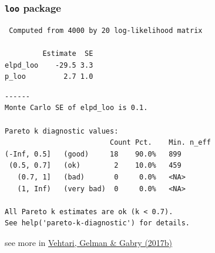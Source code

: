 \documentclass[english,t]{beamer}
\begin{document}
\begin{frame}[fragile]
  \frametitle{{\tt loo} package}

  {\scriptsize
    {\color{gray}
\begin{lstlisting}
 Computed from 4000 by 20 log-likelihood matrix

         Estimate  SE
elpd_loo    -29.5 3.3
p_loo         2.7 1.0
\end{lstlisting}
      }
\begin{lstlisting}
------
Monte Carlo SE of elpd_loo is 0.1.

Pareto k diagnostic values:
                         Count Pct.    Min. n_eff
(-Inf, 0.5]   (good)     18    90.0%   899       
 (0.5, 0.7]   (ok)        2    10.0%   459       
   (0.7, 1]   (bad)       0     0.0%   <NA>      
   (1, Inf)   (very bad)  0     0.0%   <NA>      

All Pareto k estimates are ok (k < 0.7).
See help('pareto-k-diagnostic') for details.
\end{lstlisting}
    }

    {\vspace{2\baselineskip}\small see more in \href{http://link.springer.com/article/10.1007/s11222-016-9696-4}{Vehtari, Gelman \& Gabry (2017b)}}

\end{frame}


\end{document}
